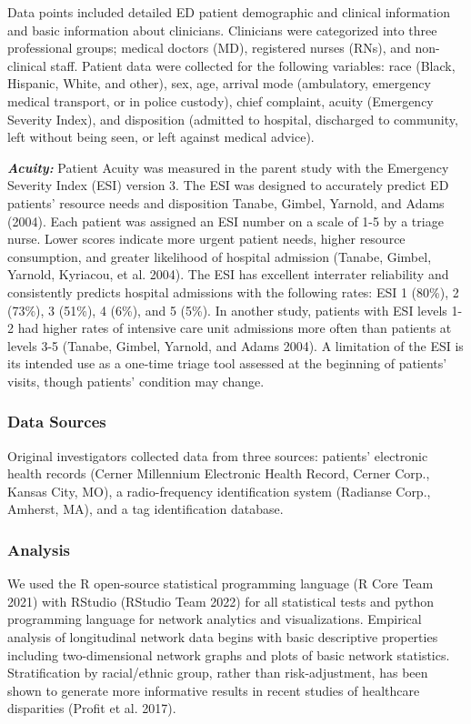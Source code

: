 \documentclass[
]{article}
\begin{document}
Data points included detailed ED patient demographic and clinical
information and basic information about clinicians. Clinicians were
categorized into three professional groups; medical doctors (MD),
registered nurses (RNs), and non-clinical staff. Patient data were
collected for the following variables: race (Black, Hispanic, White, and
other), sex, age, arrival mode (ambulatory, emergency medical transport,
or in police custody), chief complaint, acuity (Emergency Severity
Index), and disposition (admitted to hospital, discharged to community,
left without being seen, or left against medical advice).

\textbf{\emph{Acuity:}} Patient Acuity was measured in the parent study
with the Emergency Severity Index (ESI) version 3. The ESI was designed
to accurately predict ED patients' resource needs and disposition
Tanabe, Gimbel, Yarnold, and Adams (2004). Each patient was assigned an
ESI number on a scale of 1-5 by a triage nurse. Lower scores indicate
more urgent patient needs, higher resource consumption, and greater
likelihood of hospital admission (Tanabe, Gimbel, Yarnold, Kyriacou, et
al. 2004). The ESI has excellent interrater reliability and consistently
predicts hospital admissions with the following rates: ESI 1 (80\%), 2
(73\%), 3 (51\%), 4 (6\%), and 5 (5\%). In another study, patients with
ESI levels 1-2 had higher rates of intensive care unit admissions more
often than patients at levels 3-5 (Tanabe, Gimbel, Yarnold, and Adams
2004). A limitation of the ESI is its intended use as a one-time triage
tool assessed at the beginning of patients' visits, though patients'
condition may change.

\hypertarget{data-sources}{%
\subsubsection{Data Sources}\label{data-sources}}

Original investigators collected data from three sources: patients'
electronic health records (Cerner Millennium Electronic Health Record,
Cerner Corp., Kansas City, MO), a radio-frequency identification system
(Radianse Corp., Amherst, MA), and a tag identification database.

\hypertarget{analysis}{%
\subsubsection{Analysis}\label{analysis}}

We used the R open-source statistical programming language (R Core Team
2021) with RStudio (RStudio Team 2022) for all statistical tests and
python programming language for network analytics and visualizations.
Empirical analysis of longitudinal network data begins with basic
descriptive properties including two-dimensional network graphs and
plots of basic network statistics. Stratification by racial/ethnic
group, rather than risk-adjustment, has been shown to generate more
informative results in recent studies of healthcare disparities (Profit
et al. 2017).
\end{document}
